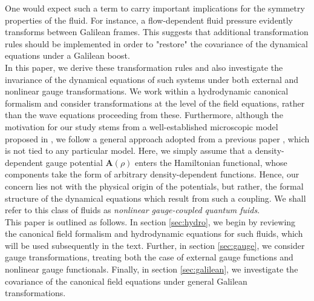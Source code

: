 \documentclass[twocolumn, nofootinbib, nobibnotes, amsmath,amssymb,aps, pra, floatfix]{revtex4-1}
\renewcommand{\v}[1]{\ensuremath{\mathbf{#1}}} %
\begin{document}
One would expect such a term to carry important implications for the symmetry properties of the fluid.
For instance, a flow-dependent fluid pressure evidently transforms between Galilean frames.
This suggests that additional transformation rules should be implemented in order to "restore" the covariance of the dynamical equations under a Galilean boost.\\
In this paper, we derive these transformation rules and also investigate the invariance of the dynamical equations of such systems under both external and nonlinear gauge transformations.
We work within a hydrodynamic canonical formalism and consider transformations at the level of the field equations, rather than the wave equations proceeding from these.
Furthermore, although the motivation for our study stems from a well-established microscopic model proposed in \cite{edmonds2013}, we follow a general approach adopted from a previous paper \cite{buggy2020hydrodynamics}, which is not tied to any particular model.
Here, we simply assume that a density-dependent gauge potential $\v{A}\left(\rho\right)$ enters the Hamiltonian functional, whose components take the form of arbitrary density-dependent functions.
Hence, our concern lies not with the physical origin of the potentials, but rather, the formal structure of the dynamical equations which result from such a coupling.
We shall refer to this class of fluids as \textit{nonlinear gauge-coupled quantum fuids}. \\
This paper is outlined as follows.
In section \ref{sec:hydro}, we begin by reviewing the canonical field formalism and hydrodynamic equations for such fluids, which will be used subsequently in the text.
Further, in section \ref{sec:gauge}, we consider gauge transformations, treating both the case of external gauge functions and nonlinear gauge functionals.
Finally, in section \ref{sec:galilean}, we investigate the covariance of the canonical field equations under general Galilean transformations.
\end{document}
